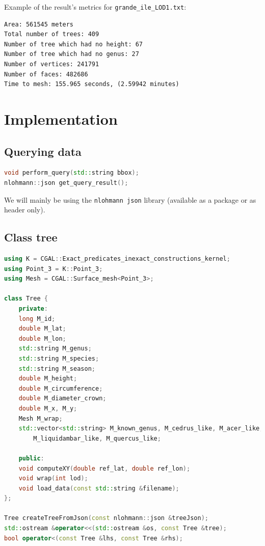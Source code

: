 \documentclass[12pt]{article}
\begin{document}
Example of the result's metrics for \texttt{grande\_ile\_LOD1.txt}:

\begin{lstlisting}
Area: 561545 meters
Total number of trees: 409
Number of tree which had no height: 67
Number of tree which had no genus: 27
Number of vertices: 241791
Number of faces: 482686
Time to mesh: 155.965 seconds, (2.59942 minutes)
\end{lstlisting}

\section{Implementation}

\subsection{Querying data}
\begin{lstlisting}[language=C++]
void perform_query(std::string bbox);
nlohmann::json get_query_result();
\end{lstlisting}

We will mainly be using the \texttt{nlohmann json} library (available as a package or as
header only).

\subsection{Class tree}
\begin{lstlisting}[language=C++]
using K = CGAL::Exact_predicates_inexact_constructions_kernel;
using Point_3 = K::Point_3;
using Mesh = CGAL::Surface_mesh<Point_3>;

class Tree {
    private:
    long M_id;
    double M_lat;
    double M_lon;
    std::string M_genus;
    std::string M_species;
    std::string M_season;
    double M_height;
    double M_circumference;
    double M_diameter_crown;
    double M_x, M_y;
    Mesh M_wrap;
    std::vector<std::string> M_known_genus, M_cedrus_like, M_acer_like,
        M_liquidambar_like, M_quercus_like;

    public:
    void computeXY(double ref_lat, double ref_lon);
    void wrap(int lod);
    void load_data(const std::string &filename);
};

Tree createTreeFromJson(const nlohmann::json &treeJson);
std::ostream &operator<<(std::ostream &os, const Tree &tree);
bool operator<(const Tree &lhs, const Tree &rhs);
\end{lstlisting}
\end{document}
